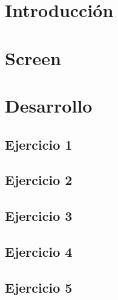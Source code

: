 \documentclass[10pt, a4paper]{article}
\begin{document}
 
	\maketitle
 	\tableofcontents
 	\newpage
 	\section {Introducción}
			 		
	  	\pagebreak
	\section {Screen}
	    

	\section {Desarrollo}
	  	\subsection{Ejercicio 1}
	  		\begin{minipage}{\linewidth}
	  			
	  		\end{minipage}
	  	
	  	\subsection{Ejercicio 2}
	  		\begin{minipage}{\linewidth}
	  			
	  		\end{minipage}
	  	
	  	\subsection{Ejercicio 3}
	  		\begin{minipage}{\linewidth}
	  			
	  		\end{minipage}
	  	
	  	\subsection{Ejercicio 4}
	  		\begin{minipage}{\linewidth}
	  			
	  		\end{minipage}
	  		
	  	\subsection{Ejercicio 5}
	  		\begin{minipage}{\linewidth}
	  			
	  		\end{minipage}
	  	
\end{document}
